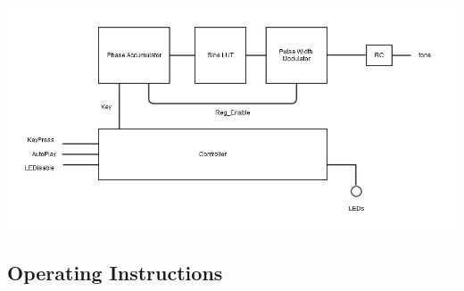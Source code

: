 \documentclass{article}
\begin{document}
    \includegraphics[width=5.5in]{img/basicblock.jpg}


  \subsection{Operating Instructions}

\end{document}
